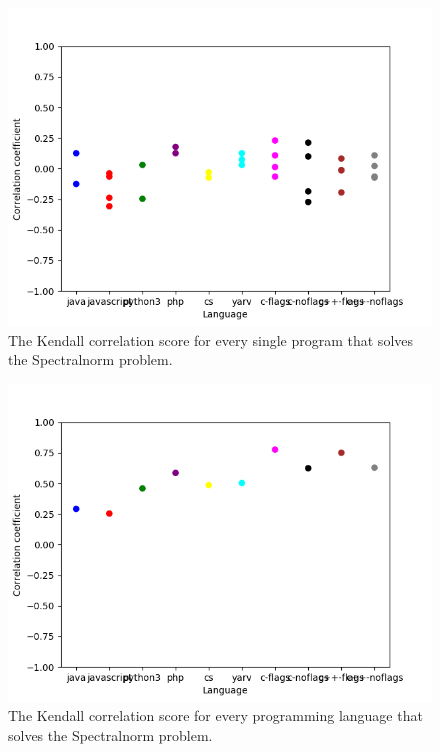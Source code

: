 \begin{appendices}
\begin{figure}[h]
    \centering
    \includegraphics[width=.6\textwidth]{graphs/kendall_Spectralnorm.png}
    \caption{The Kendall correlation score for every single program that solves the Spectralnorm problem.}
    \label{fig:corr-spectralnorm}
\end{figure}

\begin{figure}[h]
    \centering
    \includegraphics[width=.6\textwidth]{graphs/kendall-lang_Spectralnorm.png}
    \caption{The Kendall correlation score for every programming language that solves the Spectralnorm problem.}
    \label{fig:corr-lang-spectralnorm}
\end{figure}



\end{appendices}
